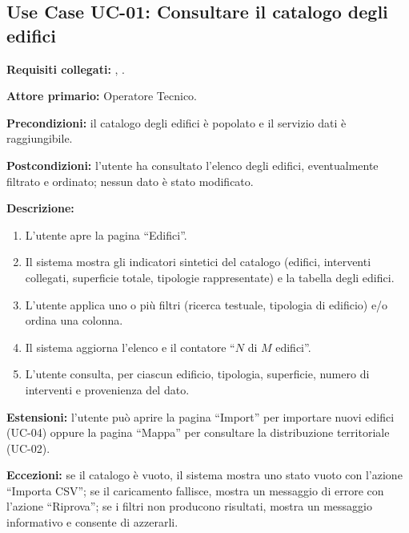 \subsection*{Use Case UC-01: Consultare il catalogo degli edifici}
\textbf{Requisiti collegati:} , .\par
\textbf{Attore primario:} Operatore Tecnico.\par
\textbf{Precondizioni:} il catalogo degli edifici è popolato e il servizio dati è raggiungibile.\par
\textbf{Postcondizioni:} l'utente ha consultato l'elenco degli edifici, eventualmente filtrato e ordinato; nessun dato è stato modificato.\par
\textbf{Descrizione:}
\begin{enumerate}[leftmargin=1.6em, itemsep=0.1em]
    \item L'utente apre la pagina ``Edifici''.
    \item Il sistema mostra gli indicatori sintetici del catalogo (edifici, interventi collegati, superficie totale, tipologie rappresentate) e la tabella degli edifici.
    \item L'utente applica uno o più filtri (ricerca testuale, tipologia di edificio) e/o ordina una colonna.
    \item Il sistema aggiorna l'elenco e il contatore ``$N$ di $M$ edifici''.
    \item L'utente consulta, per ciascun edificio, tipologia, superficie, numero di interventi e provenienza del dato.
\end{enumerate}
\textbf{Estensioni:} l'utente può aprire la pagina ``Import'' per importare nuovi edifici (UC-04) oppure la pagina ``Mappa'' per consultare la distribuzione territoriale (UC-02).\par
\textbf{Eccezioni:} se il catalogo è vuoto, il sistema mostra uno stato vuoto con l'azione ``Importa CSV''; se il caricamento fallisce, mostra un messaggio di errore con l'azione ``Riprova''; se i filtri non producono risultati, mostra un messaggio informativo e consente di azzerarli.

